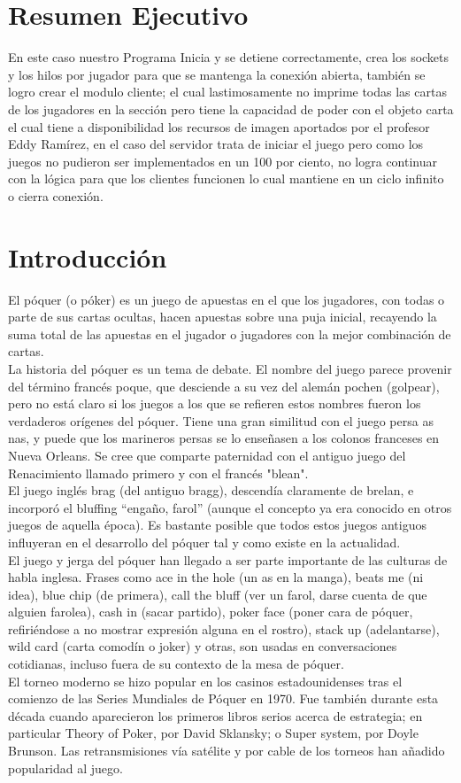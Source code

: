 \documentclass{article}
\begin{document}
\section{Resumen Ejecutivo} 
En este caso nuestro Programa Inicia y se detiene correctamente, crea los sockets y los hilos por jugador para que se mantenga la conexión abierta, también se logro crear el modulo cliente; el cual lastimosamente no imprime todas las cartas de los jugadores en la sección pero tiene la capacidad de poder con el objeto carta el cual tiene a disponibilidad los recursos de imagen aportados por el profesor Eddy Ramírez, en el caso del servidor trata de iniciar el juego pero como los juegos no pudieron ser implementados en un 100 por ciento, no logra continuar con la lógica para que los clientes funcionen lo cual mantiene en un ciclo infinito o cierra conexión.

\newpage
\section{Introducción}
El póquer (o póker) es un juego de apuestas en el que los jugadores, con todas o parte de sus cartas ocultas, hacen apuestas sobre una puja inicial, recayendo la suma total de las apuestas en el jugador o jugadores con la mejor combinación de cartas.
\\
La historia del póquer es un tema de debate. El nombre del juego parece provenir del término francés poque, que desciende a su vez del alemán pochen (golpear), pero no está claro si los juegos a los que se refieren estos nombres fueron los verdaderos orígenes del póquer. Tiene una gran similitud con el juego persa as nas, y puede que los marineros persas se lo enseñasen a los colonos franceses en Nueva Orleans. Se cree que comparte paternidad con el antiguo juego del Renacimiento llamado primero y con el francés "blean".
\\
El juego inglés brag (del antiguo bragg), descendía claramente de brelan, e incorporó el bluffing “engaño, farol” (aunque el concepto ya era conocido en otros juegos de aquella época). Es bastante posible que todos estos juegos antiguos influyeran en el desarrollo del póquer tal y como existe en la actualidad.
\\
El juego y jerga del póquer han llegado a ser parte importante de las culturas de habla inglesa. Frases como ace in the hole (un as en la manga), beats me (ni idea), blue chip (de primera), call the bluff (ver un farol, darse cuenta de que alguien farolea), cash in (sacar partido), poker face (poner cara de póquer, refiriéndose a no mostrar expresión alguna en el rostro), stack up (adelantarse), wild card (carta comodín o joker) y otras, son usadas en conversaciones cotidianas, incluso fuera de su contexto de la mesa de póquer.
\\
El torneo moderno se hizo popular en los casinos estadounidenses tras el comienzo de las Series Mundiales de Póquer en 1970. Fue también durante esta década cuando aparecieron los primeros libros serios acerca de estrategia; en particular Theory of Poker, por David Sklansky; o Super system, por Doyle Brunson. Las retransmisiones vía satélite y por cable de los torneos han añadido popularidad al juego.
\newpage
\end{document}
